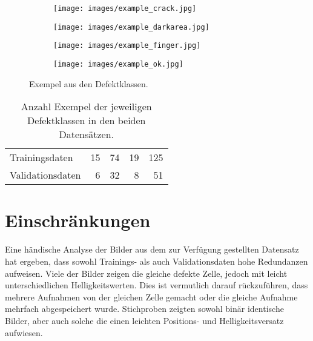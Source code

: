 \begin{figure}
    \centering
    \begin{subfigure}{0.245\textwidth}
        \texttt{[image: images/example\_crack.jpg]}
        \caption{}
    \end{subfigure}
    \begin{subfigure}{0.245\textwidth}
        \texttt{[image: images/example\_darkarea.jpg]}
        \caption{}
    \end{subfigure}
    \begin{subfigure}{0.245\textwidth}
        \texttt{[image: images/example\_finger.jpg]}
        \caption{}
    \end{subfigure}
    \begin{subfigure}{0.245\textwidth}
        \texttt{[image: images/example\_ok.jpg]}
        \caption{}
    \end{subfigure}
    \caption{Exempel aus den Defektklassen.\label{fig:example_defects}}
\end{figure}

\begin{table}
    \centering
    \caption{Anzahl Exempel der jeweiligen Defektklassen in den beiden Datensätzen.\label{tbl:datasets}}
    \begin{tabular}{l r r r r}
        \toprule
                         & {} & {} & {} & {} \\
        \midrule
        Trainingsdaten   & 15             & 74                & 19              & 125         \\
        Validationsdaten & 6              & 32                & 8               & 51          \\
        \bottomrule
    \end{tabular}
\end{table}

\section{Einschränkungen\label{sct:constraints}}

Eine händische Analyse der Bilder aus dem zur Verfügung gestellten Datensatz hat ergeben, dass sowohl Trainings- als auch Validationsdaten hohe Redundanzen aufweisen. Viele der Bilder zeigen die gleiche defekte Zelle, jedoch mit leicht unterschiedlichen Helligkeitswerten. Dies ist vermutlich darauf rückzuführen, dass mehrere Aufnahmen von der gleichen Zelle gemacht oder die gleiche Aufnahme mehrfach abgespeichert wurde. Stichproben zeigten sowohl binär identische Bilder, aber auch solche die einen leichten Positions- und Helligkeitsversatz aufwiesen.
